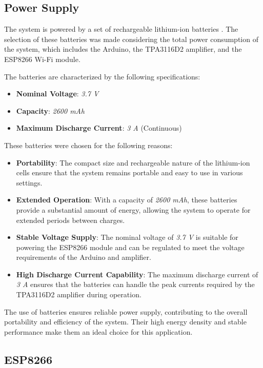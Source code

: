\subsection{Power Supply}

The system is powered by a set of rechargeable lithium-ion batteries \cite{Lithium battery}. The selection of these batteries was made considering the total power consumption of the system, which includes the Arduino, the TPA3116D2 amplifier, and the ESP8266 Wi-Fi module.

The batteries are characterized by the following specifications:

\begin{itemize}
    \item \textbf{Nominal Voltage}: \textit{3.7 V}
    \item \textbf{Capacity}: \textit{2600 mAh}
    \item \textbf{Maximum Discharge Current}: \textit{3 A} (Continuous)
\end{itemize}

These batteries were chosen for the following reasons:
\begin{itemize}
    \item \textbf{Portability}: The compact size and rechargeable nature of the lithium-ion cells ensure that the system remains portable and easy to use in various settings.
    \item \textbf{Extended Operation}: With a capacity of \textit{2600 mAh}, these batteries provide a substantial amount of energy, allowing the system to operate for extended periods between charges.
    \item \textbf{Stable Voltage Supply}: The nominal voltage of \textit{3.7 V} is suitable for powering the ESP8266 module and can be regulated to meet the voltage requirements of the Arduino and amplifier.
    \item \textbf{High Discharge Current Capability}: The maximum discharge current of \textit{3 A} ensures that the batteries can handle the peak currents required by the TPA3116D2 amplifier during operation.
\end{itemize}

The use of batteries ensures reliable power supply, contributing to the overall portability and efficiency of the system. Their high energy density and stable performance make them an ideal choice for this application.

\subsection{ESP8266}

